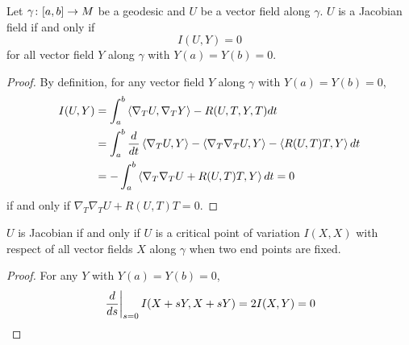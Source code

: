 \begin{enumerate}[label=\arabic{*}.]
	\begin{prop}
		Let $\gamma \colon [a,b] \rightarrow M$ be a geodesic and $U$ be a vector field along $\gamma$. $U$ is a Jacobian field if and only if
		\begin{equation*}
			I(U,Y) = 0
		\end{equation*}
		for all vector field $Y$ along $\gamma$ with $Y(a) = Y(b) = 0$.
	\end{prop}
	\begin{proof}
		By definition, for any vector field $Y$ along $\gamma$ with $Y(a) = Y(b) = 0$,
		\begin{equation*}
			\begin{aligned}
				I(U,Y)&=\int_a^b \left\langle \nabla_TU,\nabla_TY \right\rangle - R(U,T,Y,T)dt \\
				&= \int_a^b \frac{d}{dt}\left\langle \nabla_TU,Y \right\rangle-\left\langle \nabla_T\nabla_TU,Y \right\rangle-\left\langle R(U,T)T,Y \right\rangle dt\\
				&= -\int_a^b \left\langle \nabla_T\nabla_TU+R(U,T)T,Y \right\rangle dt = 0
			\end{aligned}
		\end{equation*}
		if and only if $\nabla_T\nabla_TU+R(U,T)T = 0$.
	\end{proof}
	\begin{cor}
		$U$ is Jacobian if and only if $U$ is a critical point of variation $I(X,X)$ with respect of all vector fields $X$ along $\gamma$ when two end points are fixed.
	\end{cor}
	\begin{proof}
		For any $Y$ with $Y(a) = Y(b) = 0$,
		\begin{equation*}
			\left.\frac{d}{ds}\right\lvert_{s=0}I(X+sY,X+sY) = 2I(X,Y) = 0 \qedhere
		\end{equation*}
	\end{proof}


\end{enumerate}
